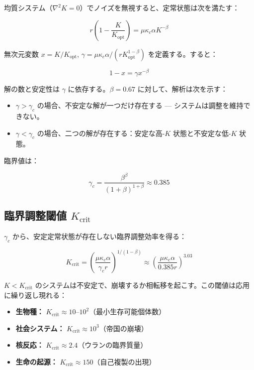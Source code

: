 \documentclass[12pt,a4paper]{article}
\newcommand{\Keffopt}{K_{\mathrm{opt}}}
\newcommand{\Keffcrit}{K_{\mathrm{crit}}}
\newcommand{\kappac}{\kappa_c}
\theoremstyle{remark}
\begin{document}
	均質システム（\(\nabla^2 K = 0\)）でノイズを無視すると、定常状態は次を満たす：
	
	\begin{equation}
		r \left(1 - \frac{K}{\Keffopt}\right) = \mu \kappac \alpha K^{-\beta}
		\label{eq:stationary}
	\end{equation}
	
	無次元変数 \(x = K/\Keffopt\), \(\gamma = \mu \kappac \alpha / (r \Keffopt^{1-\beta})\) を定義する。すると：
	
	\begin{equation}
		1 - x = \gamma x^{-\beta}
		\label{eq:dimensionless}
	\end{equation}
	
	解の数と安定性は \(\gamma\) に依存する。\(\beta = 0.67\) に対して、解析は次を示す：
	
	\begin{itemize}
		\item \(\gamma > \gamma_c\) の場合、不安定な解が一つだけ存在する — システムは調整を維持できない。
		\item \(\gamma < \gamma_c\) の場合、二つの解が存在する：安定な高-\(K\) 状態と不安定な低-\(K\) 状態。
	\end{itemize}
	
	臨界値は：
	
	\begin{equation}
		\gamma_c = \frac{\beta^{\beta}}{(1+\beta)^{1+\beta}} \approx 0.385
		\label{eq:gamma_c}
	\end{equation}
	
	\subsection{臨界調整閾値 \(\Keffcrit\)}
	
	\(\gamma_c\) から、安定定常状態が存在しない臨界調整効率を得る：
	
	\begin{equation}
		\Keffcrit = \left( \frac{\mu \kappac \alpha}{\gamma_c r} \right)^{1/(1-\beta)} \approx \left( \frac{\mu \kappac \alpha}{0.385 r} \right)^{3.03}
		\label{eq:Kcrit}
	\end{equation}
	
	\(K < \Keffcrit\) のシステムは不安定で、崩壊するか相転移を起こす。この閾値は応用に繰り返し現れる：
	
	\begin{itemize}
		\item \textbf{生物種：} \(\Keffcrit \approx 10\)--\(10^2\)（最小生存可能個体数）
		\item \textbf{社会システム：} \(\Keffcrit \approx 10^3\)（帝国の崩壊）
		\item \textbf{核反応：} \(\Keffcrit \approx 2.4\)（ウランの臨界質量）
		\item \textbf{生命の起源：} \(\Keffcrit \approx 150\)（自己複製の出現）
	\end{itemize}
	
\end{document}
